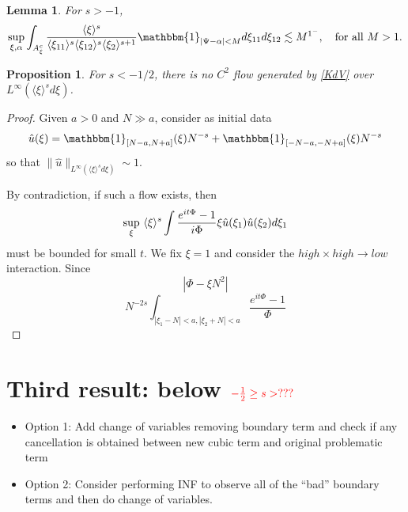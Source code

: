 \documentclass[a4paper, 11pt]{amsart}
\newcommand{\jap}[1]{\langle #1 \rangle}
\newcommand{\psia}{\mathbbm{1}_{|\Psi-\alpha|<M}}
\theoremstyle{plain}
\newtheorem{prop}[thm]{Proposition}
\newtheorem{lem}[thm]{Lemma}
\theoremstyle{definition}
\theoremstyle{remark}
\newcommand{\5}{\text{V}}
\numberwithin{equation}{section}
\theoremstyle{mytheoremstyle} \newtheorem{nota}[thm]{Remark}
\theoremstyle{mytheoremstyle} \newtheorem{exemplo}[thm]{Example}
\newcommand{\red}{\color{red}}
\begin{document}
{\begin{lem}
    For $s>-1$,
    $$
    \sup_{\xi,\alpha} \int_{A_\xi^c} \frac{\jap{\xi}^s}{\jap{\xi_{11}}^s\jap{\xi_{12}}^s\jap{\xi_2}^{s+1}}\psia d\xi_{11} d\xi_{12} \lesssim M^{1^-}, \quad \mbox{for all }M>1.
    $$
\end{lem}

\begin{prop}
    For $s<-1/2$, there is no $C^2$ flow generated by \eqref{KdV} over $L^\infty(\jap{\xi}^sd\xi)$.
\end{prop}
\begin{proof}
    Given $a>0$ and $N\gg a$, consider as initial data
    $$
    \hat{u}(\xi)=\mathbbm{1}_{[N-a, N+a]}(\xi)N^{-s} + \mathbbm{1}_{[-N-a, -N+a]}(\xi)N^{-s}
    $$
    so that $\|\hat{u}\|_{L^\infty(\jap{\xi}^sd\xi)}\sim 1$.

    By contradiction, if such a flow exists, then
    $$
    \sup_\xi \ \jap{\xi}^s\int \frac{e^{it\Phi}-1}{i\Phi}\xi \Hat{u}(\xi_1)\hat{u}(\xi_2) d\xi_1
    $$
    must be bounded for small $t$. We fix $\xi=1$ and consider the $high\times high \to low$ interaction. Since
    $$
    |\Phi - \xi N^2|
    $$
    $$
    N^{-2s}\int_{|\xi_1-N|<a, |\xi_2+N|<a} \frac{e^{it\Phi}-1}{\Phi}
    $$
\end{proof}




}

\section{Third result: below $\red -\frac12\ge s> ???$}



{\red


\begin{itemize}
\item  Option 1: Add change of variables removing boundary term and check if any cancellation is obtained between new cubic term and original problematic term

\item Option 2: Consider performing INF to observe all of the ``bad'' boundary terms and then do change of variables.
\end{itemize}
}
\end{document}
